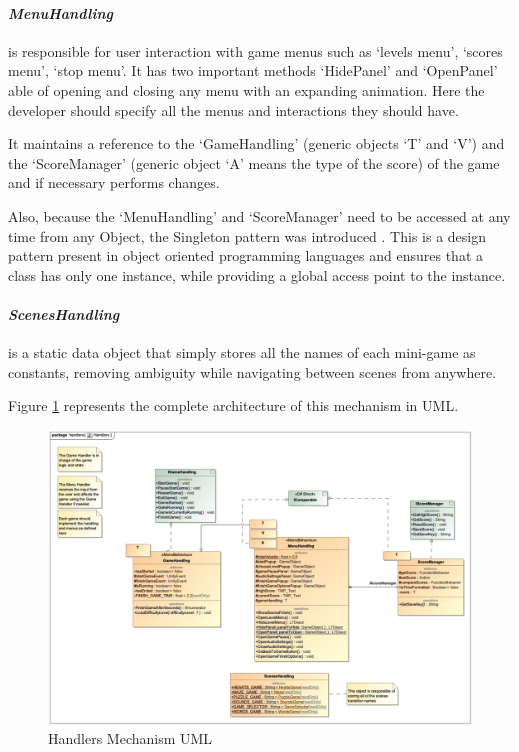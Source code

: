 \paragraph{\textit{MenuHandling}} is responsible for user interaction with game menus such as `levels menu', `scores menu', `stop menu'. It has two important methods `HidePanel' and `OpenPanel' able of opening and closing any menu with an expanding animation. Here the developer should specify all the menus and interactions they should have.

It maintains a reference to the `GameHandling' (generic objects `T' and `V') and the `ScoreManager' (generic object `A' means the type of the score) of the game and if necessary performs changes.

Also, because the `MenuHandling' and `ScoreManager' need to be accessed at any time from any Object, the Singleton pattern was introduced \cite{singleton}. This is a design pattern present in object oriented programming languages and ensures that a class has only one instance, while providing a global access point to the instance.

\paragraph{\textit{ScenesHandling}} is a static data object that simply stores all the names of each mini-game as constants, removing ambiguity while navigating between scenes from anywhere.

Figure \ref{fig:handlers} represents the complete architecture of this mechanism in UML.

\begin{figure}[H]
    \centering
    \includegraphics[scale=.4]{Chapters/arq/new/class_handlers_Handlers.jpg}
    \caption{Handlers Mechanism UML}
    \label{fig:handlers}
\end{figure}

